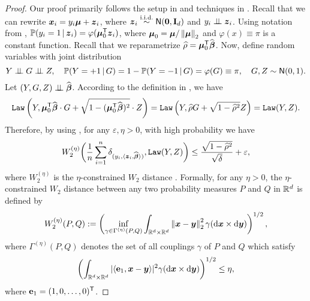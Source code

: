 \begin{proof}
Our proof primarily follows the setup in \cite[Section 4.1]{montanari2022overparametrizedlineardimensionalityreductions} and techniques in \cite[Section 4.3]{montanari2022overparametrizedlineardimensionalityreductions}. Recall that we can rewrite $\text{\boldmath $x$}_i = y_i \text{\boldmath $\mu$} + \text{\boldmath $z$}_i$, where $\text{\boldmath $z$}_i \overset{\text{i.i.d.}}{\sim} {\sf N}(\mathrm{\bf 0}, \mathrm{\bf I}_d)$ and $y_i \perp\!\!\!\perp \text{\boldmath $z$}_i$. Using notation from \cite{montanari2022overparametrizedlineardimensionalityreductions}, $\mathbb{P}(y_i = 1 \,|\, \text{\boldmath $z$}_i) = \varphi({\boldsymbol{\mu}}_0^{\sf T} \text{\boldmath $z$}_i)$, where ${\boldsymbol{\mu}}_0 = {\boldsymbol{\mu}}/\left\|{{\boldsymbol{\mu}}}\right\|_2$ and $\varphi(x) \equiv \pi$ is a constant function. Recall that we reparametrize $\widehat\rho = {\boldsymbol{\mu}}_0^{\sf T} \widehat{{\boldsymbol{\beta}}}$. Now, define random variables with joint distribution
\begin{equation*}
    Y \perp\!\!\!\perp G \perp\!\!\!\perp Z, 
    \quad \mathbb{P}(Y = +1 \,|\, G) = 1 - \mathbb{P}(Y = -1 \,|\, G) = \varphi(G) \equiv \pi, 
    \quad G, Z \sim {\sf N}(0, 1).
\end{equation*}
Let $(Y, G, Z) \perp\!\!\!\perp \widehat{{\boldsymbol{\beta}}}$. According to the definition in \cite[Lemma 4.2]{montanari2022overparametrizedlineardimensionalityreductions}, we have
\begin{equation*}
    \mathtt{Law}\left( Y, {\boldsymbol{\mu}}_0^{\sf T} \widehat{{\boldsymbol{\beta}}} \cdot G + \sqrt{1 - ({\boldsymbol{\mu}}_0^{\sf T} \widehat{{\boldsymbol{\beta}}})^2} \cdot Z \right)
    = \mathtt{Law}\left( Y, \widehat\rho G + \sqrt{1 - \widehat\rho^2} Z \right)
    = \mathtt{Law}(Y, Z).
\end{equation*}
Therefore, by using \cite[Theorem 4.3]{montanari2022overparametrizedlineardimensionalityreductions}, for any $\varepsilon, \eta > 0$, with high probability we have
\begin{equation*}
    W_2^{(\eta)} \biggl( 
        \frac1n \sum_{i=1}^n \delta_{(y_i, \langle \text{\boldmath $z$}_i, \widehat{{\boldsymbol{\beta}}} \rangle)} , 
        \mathtt{Law}(Y, Z)        
     \biggr) 
     \le \frac{\sqrt{1 - \widehat\rho^2}}{\sqrt{\delta}} + \varepsilon,
\end{equation*}
where $W_2^{(\eta)}$ is the $\eta$-constrained $W_2$ distance \cite[Definition 4.1]{montanari2022overparametrizedlineardimensionalityreductions}. Formally, for any $\eta > 0$, the $\eta$-constrained $W_2$ distance between any two probability measures $P$ and $Q$ in $\mathbb{R}^d$ is defined by
\begin{equation*}
    W_2^{(\eta)}(P, Q) := \left( \inf_{\gamma \in \Gamma^{(\eta)}(P, Q) }
    \int_{\mathbb{R}^d \times \mathbb{R}^d} \left\|{\text{\boldmath $x$} - \text{\boldmath $y$}}\right\|_2^2 \gamma(\textup{d}\text{\boldmath $x$} \times \textup{d}\text{\boldmath $y$})
    \right)^{1/2},
\end{equation*}
where $\Gamma^{(\eta)}(P, Q)$ denotes the set of all couplings $\gamma$ of $P$ and $Q$ which satisfy
\begin{equation}
    \label{eq:W2eta}
    \left(
        \int_{\mathbb{R}^d \times \mathbb{R}^d} |\langle \mathrm{\bf e}_1, \text{\boldmath $x$} - \text{\boldmath $y$} \rangle|^2 \gamma(\textup{d}\text{\boldmath $x$} \times \textup{d}\text{\boldmath $y$}) 
    \right)^{1/2}    
    \le \eta,
\end{equation}
where $\mathrm{\bf e}_1 = (1, 0, \dots, 0)^{\sf T}$. 



\end{proof}
